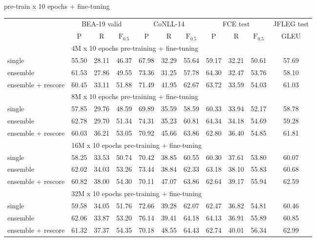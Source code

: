 \documentclass[11pt]{article}
\begin{document}
\begin{multicols}{2}
	\vspace{-1em}
	\begin{table}[H]
		\centering
		\tiny
		\tabcolsep 1.2pt
		pre-train x 10 epochs + fine-tuning \\
		\begin{tabular}{@{\extracolsep{2.5pt}}l ccc|ccc|ccc|c@{}}
			\hline
			& \multicolumn{3}{c}{BEA-19 valid}
			& \multicolumn{3}{c}{CoNLL-14}
			& \multicolumn{3}{c}{FCE test}
			& \multicolumn{1}{c}{\hspace{-2em}JFLEG test\hspace{-2em}}
			\\ \cline{2-4} \cline{5-7} \cline{8-10} \cline{11-11}
			& P & R & $\textrm{F}_{0.5}$
			& P & R & $\textrm{F}_{0.5}$
			& P & R & $\textrm{F}_{0.5}$
			& GLEU \\
			\hline
			& \multicolumn{10}{l}{4M x 10 epochs pre-training + fine-tuning} \\
			single
			& 55.50 & 28.11 & 46.37 & 67.98 & 32.29 & 55.64 & 59.17 & 32.21 & 50.61 & 57.69 \\
			ensemble
			& 61.53 & 27.86 & 49.55 & 73.36 & 31.25 & 57.78 & 64.30 & 32.47 & 53.76 & 58.10 \\
			ensemble + rescore
			& 60.45 & 33.11 & 51.88 & 71.49 & 41.95 & 62.67 & 63.72 & 33.59 & 54.03 & 61.03 \\
			\hline
			& \multicolumn{10}{l}{8M x 10 epochs pre-training + fine-tuning} \\
			single
			& 57.85 & 29.76 & 48.59 & 69.89 & 35.59 & 58.59 & 60.33 & 33.94 & 52.17 & 58.78 \\
			ensemble
			& 62.78 & 29.70 & 51.34 & 74.31 & 35.23 & 60.81 & 64.34 & 34.18 & 54.69 & 59.28 \\
			ensemble + rescore
			& 60.03 & 36.21 & 53.05 & 70.92 & 45.66 & 63.86 & 62.80 & 36.40 & 54.85 & 61.81 \\
			\hline
			& \multicolumn{10}{l}{16M x 10 epochs pre-training + fine-tuning} \\
			single
			& 58.25 & 33.53 & 50.74 & 70.42 & 38.85 & 60.55 & 60.30 & 37.61 & 53.80 & 60.07 \\
			ensemble
			& 62.02 & 34.03 & 53.26 & 73.44 & 38.84 & 62.33 & 63.18 & 38.10 & 55.83 & 60.68 \\
			ensemble + rescore
			& 60.82 & 38.00 & 54.30 & 70.11 & 47.07 & 63.86 & 62.64 & 39.17 & 55.94 & 62.59 \\
			\hline
			& \multicolumn{10}{l}{32M x 10 epochs pre-training + fine-tuning} \\
			single
			& 59.58 & 34.05 & 51.76 & 72.66 & 39.28 & 62.07 & 62.47 & 36.82 & 54.81 & 60.46 \\
			ensemble
			& 62.06 & 33.87 & 53.20 & 76.14 & 39.41 & 64.18 & 64.13 & 36.91 & 55.89 & 60.85 \\
			ensemble + rescore
			& 61.32 & 37.37 & 54.35 & 70.18 & 48.55 & 64.43 & 62.74 & 40.01 & 56.34 & 62.99 \\
			\hline
		\end{tabular}
	\end{table}


\end{multicols}
\end{document}
